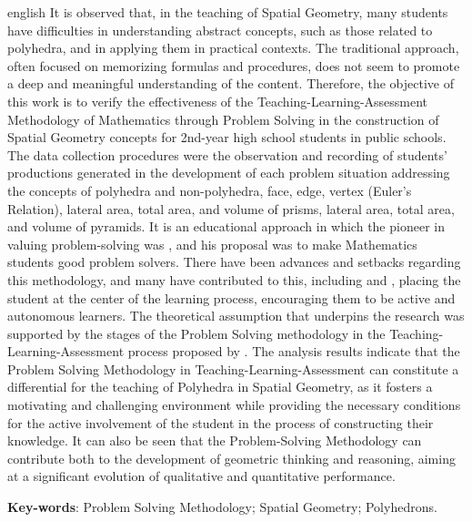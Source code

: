 
\begin{resumo}[Abstract]
	\begin{otherlanguage*}{english}
		It is observed that, in the teaching of Spatial Geometry, many students have difficulties in understanding abstract concepts, such as those related to polyhedra, and in applying them in practical contexts. The traditional approach, often focused on memorizing formulas and procedures, does not seem to promote a deep and meaningful understanding of the content. Therefore, the objective of this work is to verify the effectiveness of the Teaching-Learning-Assessment Methodology of Mathematics through Problem Solving in the construction of Spatial Geometry concepts for 2nd-year high school students in public schools. The data collection procedures were the observation and recording of students' productions generated in the development of each problem situation addressing the concepts of polyhedra and non-polyhedra, face, edge, vertex (Euler's Relation), lateral area, total area, and volume of prisms, lateral area, total area, and volume of pyramids. It is an educational approach in which the pioneer in valuing problem-solving was , and his proposal was to make Mathematics students good problem solvers. There have been advances and setbacks regarding this methodology, and many have contributed to this, including  and , placing the student at the center of the learning process, encouraging them to be active and autonomous learners. The theoretical assumption that underpins the research was supported by the stages of the Problem Solving methodology in the Teaching-Learning-Assessment process proposed by . The analysis results indicate that the Problem Solving Methodology in Teaching-Learning-Assessment can constitute a differential for the teaching of Polyhedra in Spatial Geometry, as it fosters a motivating and challenging environment while providing the necessary conditions for the active involvement of the student in the process of constructing their knowledge. It can also be seen that the Problem-Solving Methodology can contribute both to the development of geometric thinking and reasoning, aiming at a significant evolution of qualitative and quantitative performance.

		\vspace{\onelineskip}

		\noindent
		\textbf{Key-words}: Problem Solving Methodology; Spatial Geometry; Polyhedrons.
	\end{otherlanguage*}
\end{resumo}

